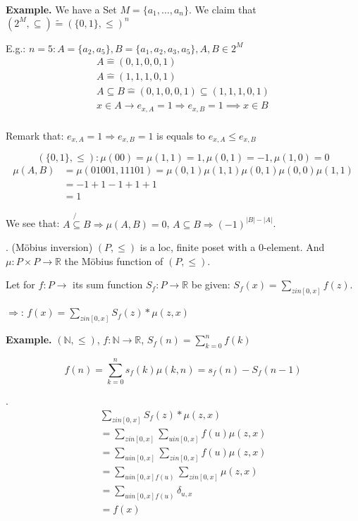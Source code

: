 \textbf{Example.}
We have a Set $M = \{a_1, \ldots , a_n\}$. We claim that $(2^M, \subseteq) \tilde{=} ( \{0,1\}, \leq)^n$

E.g.: $n = 5: A = \{a_2,a_5\}, B= \{a_1, a_2, a_3, a_5\}, A, B \in 2^M$
\begin{align*}
    A \hat{=} (0,1,0,0,1) \\
    A \hat{=} (1,1,1,0,1) \\
    A \subseteq B \hat{=} (0,1,0,0,1) \subseteq (1,1,1,0,1) \\
    x \in A \rightarrow e_{x,A} = 1 \Rightarrow  e_{x,B} = 1 \implies x \in B\\
\end{align*}

Remark that: $e_{x,A} = 1 \Rightarrow  e_{x,B} = 1$ is equals to $e_{x,A} \leq e_{x,B}$ 

\[
    ( \{0,1\}, \leq): \mu(00) = \mu(1,1) = 1, \mu(0,1) = -1, \mu(1,0) = 0
\]
\begin{align*}
    \mu(A,B) &= \mu(01001, 11101) = \mu(0,1) \mu(1,1) \mu(0,1) \mu(0,0) \mu(1,1) \\
    &= -1 +1 -1 +1 +1 \\
    &= 1
\end{align*}

We see that: 
$ A\not{\subseteq} B \Rightarrow \mu(A,B) = 0$, 
$A\subseteq B \Rightarrow (-1) ^{|B| - |A|}$. 

\Theorem.
(Möbius inversion)
$(P, \leq)$ is a loc, finite poset with a 0-element. 
And $\mu: P \times P \rightarrow \mathbb{R}$ the Möbius function of $(P, \leq)$. 

Let for $f: P \rightarrow \mathbb{}$ its sum function $S_f: P \rightarrow \mathbb{R}$ be given: $S_f(x) = \sum_{z in [0,x]} f(z)$. 

$\Rightarrow$: $f(x) = \sum_{z in [0,x]} S_f(z) * \mu(z,x)$

\textbf{Example.}
$(\mathbb{N}, \leq)$, $f: \mathbb{N} \rightarrow \mathbb{R}$, $S_f(n) = \sum_{k=0}^{n} f(k)$

\[    
  f(n) = \sum_{k=0}^{n} s_f(k) \mu(k,n) = s_f(n) - S_f(n-1)
\]

\Proof. 
\begin{align*}
    \sum_{z in [0,x]} S_f(z) * \mu(z,x) \\
    = \sum_{z in [0,x]} \sum_{u in [0,x]} f(u) \mu(z,x) \\
    = \sum_{u in [0,x]} \sum_{z in [0,x]} f(u) \mu(z,x) \\
    = \sum_{u in [0,x] f(u)} \sum_{z in [0,x]} \mu(z,x) \\
    = \sum_{u in [0,x] f(u)} \delta_{u,x} \\
    = f(x)
\end{align*}
















